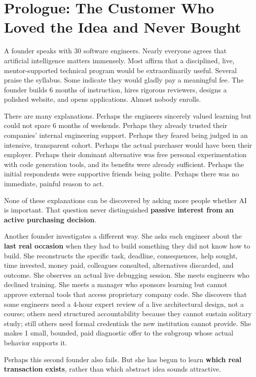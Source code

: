 \section*{Prologue: The Customer Who Loved the Idea and Never Bought}

A founder speaks with 30 software engineers. Nearly everyone agrees that artificial intelligence matters immensely. Most affirm that a disciplined, live, mentor-supported technical program would be extraordinarily useful. Several praise the syllabus. Some indicate they would gladly pay a meaningful fee. The founder builds 6 months of instruction, hires rigorous reviewers, designs a polished website, and opens applications. Almost nobody enrolls.

There are many explanations. Perhaps the engineers sincerely valued learning but could not spare 6 months of weekends. Perhaps they already trusted their companies' internal engineering support. Perhaps they feared being judged in an intensive, transparent cohort. Perhaps the actual purchaser would have been their employer. Perhaps their dominant alternative was free personal experimentation with code generation tools, and its benefits were already sufficient. Perhaps the initial respondents were supportive friends being polite. Perhaps there was no immediate, painful reason to act.

None of these explanations can be discovered by asking more people whether AI is important. That question never distinguished \textbf{passive interest from an active purchasing decision}.

Another founder investigates a different way. She asks each engineer about the \textbf{last real occasion} when they had to build something they did not know how to build. She reconstructs the specific task, deadline, consequences, help sought, time invested, money paid, colleagues consulted, alternatives discarded, and outcome. She observes an actual live debugging session. She meets engineers who declined training. She meets a manager who sponsors learning but cannot approve external tools that access proprietary company code. She discovers that some engineers need a 4-hour expert review of a live architectural design, not a course; others need structured accountability because they cannot sustain solitary study; still others need formal credentials the new institution cannot provide. She makes 1 small, bounded, paid diagnostic offer to the subgroup whose actual behavior supports it.

Perhaps this second founder also fails. But she has begun to learn \textbf{which real transaction exists}, rather than which abstract idea sounds attractive.

